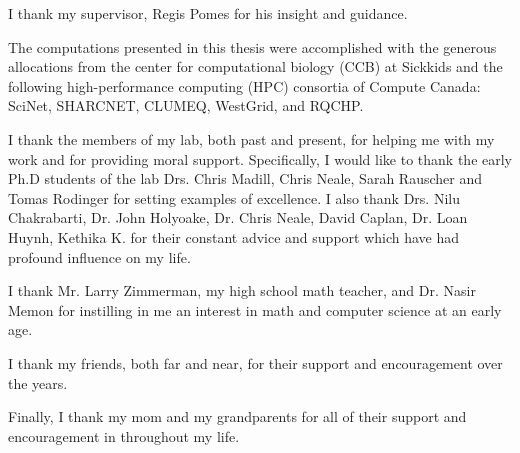 I thank my supervisor, Regis Pomes for his insight and guidance.

The computations presented in this thesis were accomplished with the generous allocations from the center for computational biology (CCB) at Sickkids and the following high-performance computing (HPC) consortia of Compute Canada: SciNet, SHARCNET, CLUMEQ, WestGrid, and RQCHP.

I thank the members of my lab, both past and present, for helping me with my work and for providing moral support.  Specifically, I would like to thank the early Ph.D students of the lab Drs. Chris Madill, Chris Neale, Sarah Rauscher and Tomas Rodinger for setting examples of excellence.  I also thank Drs. Nilu Chakrabarti, Dr. John Holyoake, Dr. Chris Neale, David Caplan, Dr. Loan Huynh, Kethika K. for their constant advice and support which have had profound influence on my life.

I thank Mr. Larry Zimmerman, my high school math teacher, and Dr. Nasir Memon for instilling in me an interest in math and computer science at an early age.

I thank my friends, both far and near, for their support and encouragement over the years. 

Finally, I thank my mom and my grandparents for all of their support and encouragement in throughout my life.